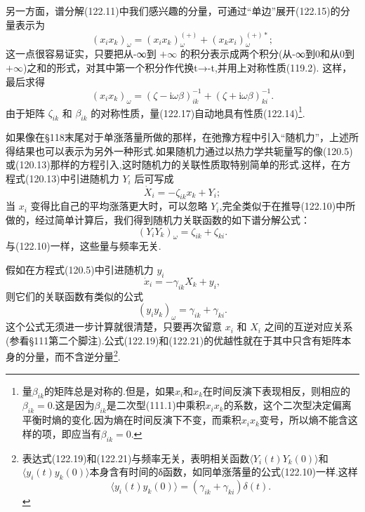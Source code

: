 另一方面，谱分解(122.11)中我们感兴趣的分量，可通过“单边”展开(122.15)的分量表示为
\begin{equation}
  (x_ix_k)_\omega=(x_ix_k)_\omega^{(+)}+(x_kx_i)_\omega^{(+)*};
\end{equation}
这一点很容易证实，只要把从-∞到 $+\infty$ 的积分表示成两个积分(从-∞到0和从0到 $+\infty$)之和的形式，对其中第一个积分作代换t→-t,并用上对称性质(119.2). 这样，最后求得
\begin{equation}
  (x_ix_k)_\omega=(\zeta-\mathrm{i}\omega\beta)^{-1}_{ik}
  +(\zeta+\mathrm{i}\omega\beta)^{-1}_{ki}.
\end{equation}
由于矩阵 $\zeta_{ik}$ 和 $\beta_{ik}$ 的对称性质，量(122.17)自动地具有性质(122.14)\footnote{量$\beta_{ik}$的矩阵总是对称的.但是，如果$x_i$和$x_k$在时间反演下表现相反，则相应的$\beta_{ik}=0$.这是因为$\beta_{ik}$是二次型(111.1)中乘积$x_ix_k$的系数，这个二次型决定偏离平衡时熵的变化.因为熵在时间反演下不变，而乘积$x_ix_k$变号，所以熵不能含这样的项，即应当有$\beta_{ik}=0$.}.

如果像在§118末尾对于单涨落量所做的那样，在弛豫方程中引入“随机力”，上述所得结果也可以表示为另外一种形式.如果随机力通过以热力学共轭量写的像(120.5)或(120.13)那样的方程引入,这时随机力的关联性质取特别简单的形式.这样，在方程式(120.13)中引进随机力 $Y_i$ 后可写成
\begin{equation}
  \dot{X}_i=-\zeta_{ik}x_k+Y_i;
\end{equation}
当 $x_i$ 变得比自己的平均涨落更大时，可以忽略 $Y_i$,完全类似于在推导(122.10)中所做的，经过简单计算后，我们得到随机力关联函数的如下谱分解公式：
\begin{equation}
  (Y_iY_k)_\omega=\zeta_{ik}+\zeta_{ki}.
\end{equation}
与(122.10)一样，这些量与频率无关.

假如在方程式(120.5)中引进随机力 $y_i$
\begin{equation}
  \dot{x}_i=-\gamma_{ik}X_k+y_i,
\end{equation}
则它们的关联函数有类似的公式
\begin{equation}
  (y_iy_k)_\omega=\gamma_{ik}+\gamma_{ki}.
\end{equation}
这个公式无须进一步计算就很清楚，只要再次留意 $x_i$ 和 $X_i$ 之间的互逆对应关系(参看§111第二个脚注).公式(122.19)和(122.21)的优越性就在于其中只含有矩阵本身的分量，而不含逆分量\footnote{表达式(122.19)和(122.21)与频率无关，表明相关函数$\langle Y_i(t)Y_k(0)\rangle$和$\langle y_i(t)y_k(0)\rangle$本身含有时间的δ函数，如同单涨落量的公式(122.10)一样.这样
\begin{equation}
  \langle y_i(t)y_k(0)\rangle=(\gamma_{ik}+\gamma_{ki})\delta(t).\tag{122.21a}
\end{equation}}.

